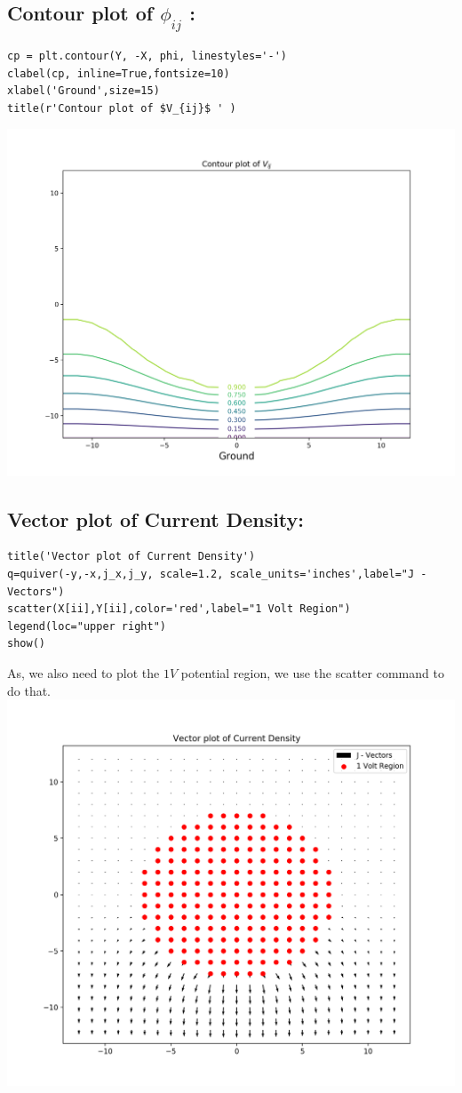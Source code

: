 \documentclass[10pt,english, openany]{book}
\begin{document}
\subsection{Contour plot of $\phi_{ij}$ :}
\begin{verbatim}
cp = plt.contour(Y, -X, phi, linestyles='-')
clabel(cp, inline=True,fontsize=10)
xlabel('Ground',size=15)
title(r'Contour plot of $V_{ij}$ ' )
\end{verbatim}

{\centering\includegraphics[scale=0.7]{Figure_5.png}}
\newpage
\subsection{Vector plot of Current Density:}
\begin{verbatim}
title('Vector plot of Current Density')
q=quiver(-y,-x,j_x,j_y, scale=1.2, scale_units='inches',label="J - Vectors")
scatter(X[ii],Y[ii],color='red',label="1 Volt Region")
legend(loc="upper right")
show()
\end{verbatim}
As, we also need to plot the $1V$ potential region, we use the scatter command to do that.\\
{\centering\includegraphics[scale=0.7]{Figure_6.png}}
\end{document}
